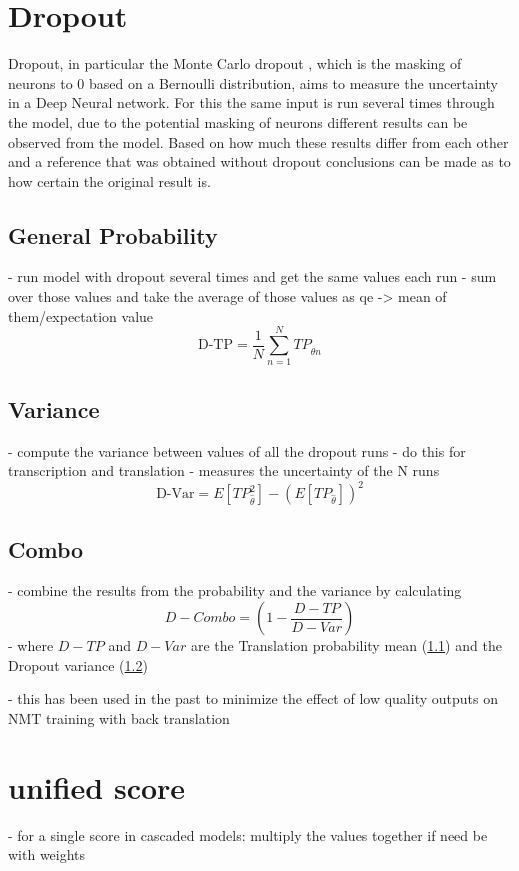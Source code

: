 \section{Dropout}
Dropout, in particular the Monte Carlo dropout \cite{gal2016dropoutbayesianapproximationrepresenting}, which is the masking of neurons to 0 based on a Bernoulli distribution, aims to measure the uncertainty in a Deep Neural network. 
For this the same input is run several times through the model, due to the potential masking of neurons different results can be observed from the model. Based on how much these results differ from each other and a reference that was obtained without dropout conclusions can be made as to how certain the original result is. 

\subsection{General Probability}
\label{dropoutprob}
- run model with dropout several times and get the same values each run 
- sum over those values and take the average of those values as qe -> mean of them/expectation value
$$\text{D-TP}=\frac{1}{N}\sum_{n=1}^N TP_{\hat\theta n}\label{formula:dropoutprobability}$$


\subsection{Variance}
\label{dropoutvar}
- compute the variance between values of all the dropout runs 
- do this for transcription and translation 
- measures the uncertainty of the N runs 
$$\text{D-Var}=E[TP_{\hat\theta}^2]-(E[TP_{\hat\theta}])^2\label{formula:dropoutvariance}$$

\subsection{Combo}
- combine the results from the probability and the variance by calculating $$D-Combo=(1-\frac{D-TP}{D-Var})\label{formula:Dropoutcombo}$$
- where $D-TP$ and $D-Var$ are the Translation probability mean (\ref{dropoutprob}) and the Dropout variance (\ref{dropoutvar})

- this has been used in the past to minimize the effect of low quality outputs on NMT training with back translation \cite{wang-etal-2018-alibaba} 

\section{unified score}
- for a single score in cascaded models: multiply the values together if need be with weights 
